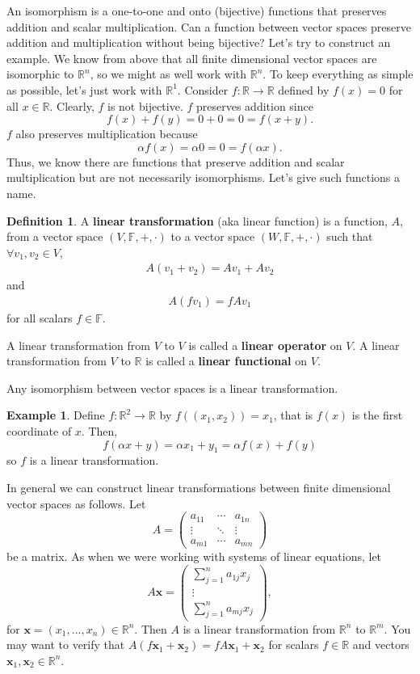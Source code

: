 \documentclass[12pt,reqno]{amsart}
\def\F{\mathbb{F}}
\def\R{\mathbb{R}}
\newcommand{\gmatrix}[1]{\begin{pmatrix} {#1}_{11} & \cdots &
    {#1}_{1n} \\ \vdots & \ddots & \vdots \\ {#1}_{m1} & \cdots &
    {#1}_{mn} \end{pmatrix}}
\theoremstyle{definition}
\newtheorem{definition}{Definition}[section]
\newtheorem{example}{Example}[section]
\begin{document}
An isomorphism is a one-to-one and onto (bijective) functions that
preserves addition and scalar multiplication. Can a function between
vector spaces preserve addition and multiplication without being
bijective?  Let's try to construct an example. We know from above that
all finite dimensional vector spaces are isomorphic to $\R^n$, so we
might as well work with $\R^n$. To keep everything as simple as
possible, let's just work with $\R^1$. Consider $f:\R \to \R$ defined
by $f(x) = 0$ for all $x \in \R$. Clearly, $f$ is not bijective. $f$
preserves addition since
\[ f(x) + f(y) = 0 + 0 = 0 = f(x+y). \]
$f$ also preserves multiplication because 
\[ \alpha f(x) = \alpha 0 = 0 = f(\alpha x). \]
Thus, we know there are functions that preserve addition and scalar
multiplication but are not necessarily isomorphisms. Let's give such
functions a name. 
\begin{definition}
  A \textbf{linear transformation} (aka linear function) is a
  function, $A$, from a vector space $(V,\F,+,\cdot)$ to a vector
  space $(W,\F,+,\cdot)$ such that $\forall v_1, v_2 \in V$,
  \begin{align*}
    A (v_1 + v_2) = A v_1 + A v_2 
  \end{align*}
  and 
  \begin{align*}
    A (f v_1) = f A v_1
  \end{align*}
  for all scalars $f \in \F$.   

  A linear transformation from $V$ to $V$ is called a \textbf{linear
    operator} on $V$. A linear transformation from $V$ to $\R$ is
  called a \textbf{linear functional} on $V$.
\end{definition}
Any isomorphism between vector spaces is a linear
transformation. 
\begin{example}
  Define $f: \R^2 \to \R$ by $f( (x_1, x_2) ) = x_1$, that is $f(x)$ is
  the first coordinate of $x$. Then,
  \[ f(\alpha x + y) = \alpha x_1 + y_1 = \alpha f(x) + f(y) \]
  so $f$ is a linear transformation.
\end{example}

In general we can construct linear transformations between finite
dimensional vector spaces as follows. Let 
\[ A = \gmatrix{a} \]
be a matrix. As when we were working with systems of linear equations,
let 
\[ A\mathbf{x} = 
\begin{pmatrix} 
  \sum_{j=1}^n a_{1j} x_j \\
  \vdots \\
  \sum_{j=1}^n a_{mj} x_j 
\end{pmatrix}, \] for $\mathbf{x} = (x_1, ..., x_n) \in \R^n$. Then
$A$ is a linear transformation from $\R^n$ to $\R^m$. You may want to
verify that $A(f \mathbf{x}_1 + \mathbf{x}_2 ) = f A
\mathbf{x}_1 + \mathbf{x}_2$ for scalars $f \in \R$ and
vectors $\mathbf{x}_1, \mathbf{x}_2 \in \R^n$. 
\end{document}
